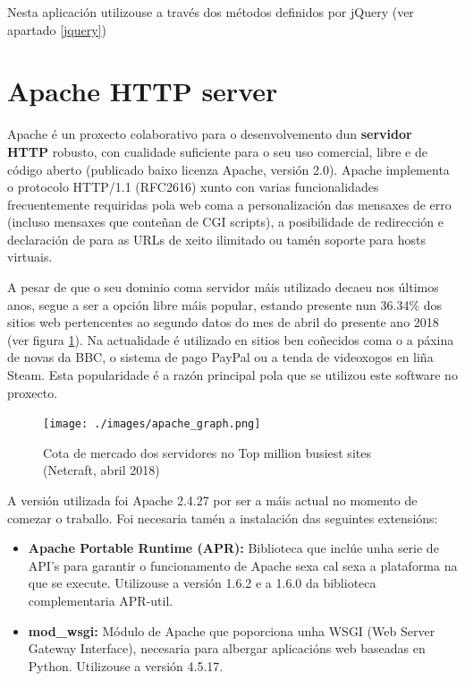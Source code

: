 Nesta aplicación utilizouse a través dos métodos definidos por jQuery (ver apartado \ref{jquery})

\section{Apache HTTP server}

Apache é un proxecto colaborativo para o desenvolvemento dun \textbf{servidor HTTP} robusto, con cualidade suficiente para o seu uso comercial, libre e de código aberto (publicado baixo licenza Apache, versión 2.0\cite{apache}). Apache implementa o protocolo HTTP/1.1 (RFC2616) xunto con varias funcionalidades frecuentemente requiridas pola web coma a personalización das mensaxes de erro (incluso mensaxes que conteñan de CGI scripts), a posibilidade de redirección e declaración de  para as URLs de xeito ilimitado ou tamén soporte para hosts virtuais.

A pesar de que o seu dominio coma servidor máis utilizado decaeu nos últimos anos, segue a ser a opción libre máis popular, estando presente nun 36.34\% dos sitios web pertencentes ao  segundo datos do mes de abril do presente ano 2018 (ver figura \ref{fig:img_netcraft}). Na actualidade é utilizado en sitios ben coñecidos coma o a páxina de novas da BBC, o sistema de pago PayPal ou a tenda de videoxogos en liña Steam\cite{netcraft}. Esta popularidade é a razón principal pola que se utilizou este software no proxecto.

\begin{figure}[h]
	\centering
	\texttt{[image: ./images/apache\_graph.png]}
	\caption{Cota de mercado dos servidores no Top million busiest sites (Netcraft, abril 2018)}
	\label{fig:img_netcraft}
\end{figure}

A versión utilizada foi Apache 2.4.27 por ser a máis actual no momento de comezar o traballo. Foi necesaria tamén a instalación das seguintes extensións:

\begin{itemize}
	\item \textbf{Apache Portable Runtime (APR):} Biblioteca que inclúe unha serie de API's para garantir o funcionamento de Apache sexa cal sexa a plataforma na que se execute. Utilizouse a versión 1.6.2 e a 1.6.0 da biblioteca complementaria APR-util. 
	
	\item \textbf{mod\_wsgi:} Módulo de Apache que poporciona unha WSGI (Web Server Gateway Interface), necesaria para albergar aplicacións web baseadas en Python. Utilizouse a versión 4.5.17.
\end{itemize}


